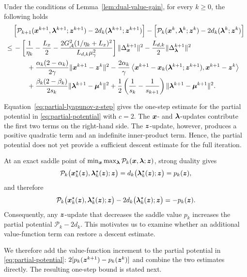 \begin{lemma}
\label{lem:partial-lyapunov-z-step}
Under the conditions of Lemma~\ref{lem:dual-value-gain}, for every $k\ge0$, the following holds
\begin{equation}
\begin{aligned}
&\Big[
\mathcal P_{k+1}(\bm{x}^{k+1},\bm{\lambda}^{k+1};\bm{z}^{k+1})
-2d_k(\bm{\lambda}^{k+1};\bm{z}^{k+1})
\Big] -
\Big[
\mathcal P_k(\bm{x}^k,\bm{\lambda}^k;\bm{z}^k)
-2d_k(\bm{\lambda}^k;\bm{z}^k)
\Big]\\
\le\,&
-\left[
\frac1{\eta_k}-\frac{L_x}{2}
-\frac{2G_{\mathcal A}^2(1/\eta_k+L_x)^2}
{L_{d,k}\mu_\gamma^2}
\right]
\|\Delta_{\bm{x}}^{k+1}\|^2 -\frac{L_{d,k}}{2}\|\Delta_{\bm{\lambda}}^{k+1}\|^2 \\
&\qquad
+\frac{\alpha_k(2-\alpha_k)}{2\gamma}
\|\bm{x}^{k+1}-\bm{z}^k\|^2
-\frac{2\alpha_k}{\gamma}
\left\langle
\bm{x}^{k+1}
-\bm{x}_k(\bm{\lambda}^{k+1};\bm{z}^{k+1}),
\bm{x}^{k+1}-\bm{z}^k
\right\rangle  \\
&\qquad
+\frac{\beta_k(2-\beta_k)}{2s_k}
\|\bm{\lambda}^{k+1}-\bm{\mu}^k\|^2
+\frac12\left(\frac1{s_k}-\frac1{s_{k+1}}\right)
\|\bm{\lambda}^{k+1}-\bm{\mu}^{k+1}\|^2.
\end{aligned}
\label{eq:partial-lyapunov-z-step}
\end{equation}
\end{lemma}
Equation~\eqref{eq:partial-lyapunov-z-step} gives the one-step estimate
for the partial potential in \eqref{eq:partial-potential} with $c=2$.
The $\bm{x}$- and
$\bm{\lambda}$-updates contribute the first two terms on the right-hand side.
The $\bm{z}$-update, however, produces a positive quadratic term and an
indefinite inner-product term. Hence, the partial potential does not yet
provide a sufficient descent estimate for the full iteration.

At an exact saddle point of
\(\min_{\bm{x}}\max_{\bm{\lambda}}\mathcal P_k(\bm{x},\bm{\lambda};\bm{z})\),
strong duality gives
\[
    \mathcal P_k\bigl(\bm{x}_k^\star(\bm{z}),
    \bm{\lambda}_k^\star(\bm{z});\bm{z}\bigr)
    =d_k\bigl(\bm{\lambda}_k^\star(\bm{z});\bm{z}\bigr)
    =p_k(\bm{z}),
\]
and therefore
\[
    \mathcal P_k\bigl(\bm{x}_k^\star(\bm{z}),
    \bm{\lambda}_k^\star(\bm{z});\bm{z}\bigr)
    -2d_k\bigl(\bm{\lambda}_k^\star(\bm{z});\bm{z}\bigr)
    =-p_k(\bm{z}).
\]
Consequently, any $\bm{z}$-update that decreases the saddle value $p_k$
increases the partial potential $\mathcal P_k-2d_k$. This motivates us
to examine whether an additional value-function term can restore a descent
estimate.

We therefore add the value-function increment to the partial potential in
\eqref{eq:partial-potential}:
$2[p_k(\bm{z}^{k+1})-p_k(\bm{z}^k)]$ and combine the two estimates directly.
The resulting one-step bound is stated next.

